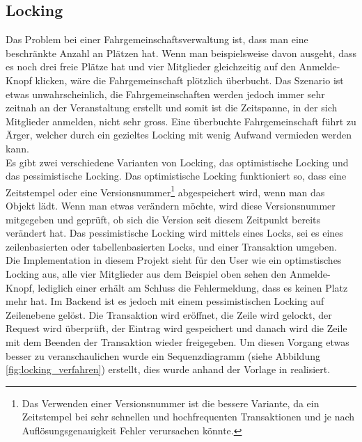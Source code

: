 \subsection{Locking}
Das Problem bei einer Fahrgemeinschaftsverwaltung ist, dass man eine beschränkte Anzahl an Plätzen hat. Wenn man beispielsweise davon ausgeht, dass es noch drei freie Plätze hat und vier Mitglieder gleichzeitig auf den Anmelde-Knopf klicken, wäre die Fahrgemeinschaft plötzlich überbucht. Das Szenario ist etwas unwahrscheinlich, die Fahrgemeinschaften werden jedoch immer sehr zeitnah an der Veranstaltung erstellt und somit ist die Zeitspanne, in der sich Mitglieder anmelden, nicht sehr gross. Eine überbuchte Fahrgemeinschaft führt zu Ärger, welcher durch ein gezieltes Locking mit wenig Aufwand vermieden werden kann.\\

Es gibt zwei verschiedene Varianten von Locking, das optimistische Locking und das pessimistische Locking. Das optimistische Locking funktioniert so, dass eine Zeitstempel oder eine Versionsnummer\footnote{Das Verwenden einer Versionsnummer ist die bessere Variante, da ein Zeitstempel bei sehr schnellen und hochfrequenten Transaktionen und je nach Auflösungsgenauigkeit Fehler verursachen könnte.} abgespeichert wird, wenn man das Objekt lädt. Wenn man etwas verändern möchte, wird diese Versionsnummer mitgegeben und geprüft, ob sich die Version seit diesem Zeitpunkt bereits verändert hat. Das pessimistische Locking wird mittels eines Locks, sei es eines zeilenbasierten oder tabellenbasierten Locks, und einer Transaktion umgeben.\\

Die Implementation in diesem Projekt sieht für den User wie ein optimstisches Locking aus, alle vier Mitglieder aus dem Beispiel oben sehen den Anmelde-Knopf, lediglich einer erhält am Schluss die Fehlermeldung, dass es keinen Platz mehr hat. Im Backend ist es jedoch mit einem pessimistischen Locking auf Zeilenebene gelöst. Die Transaktion wird eröffnet, die Zeile wird gelockt, der Request wird überprüft, der Eintrag wird gespeichert und danach wird die Zeile mit dem Beenden der Transaktion wieder freigegeben. Um diesen Vorgang etwas besser zu veranschaulichen wurde ein Sequenzdiagramm (siehe Abbildung \ref{fig:locking_verfahren}) erstellt, dies wurde anhand der Vorlage in \cite{soft_arch_book} realisiert.

